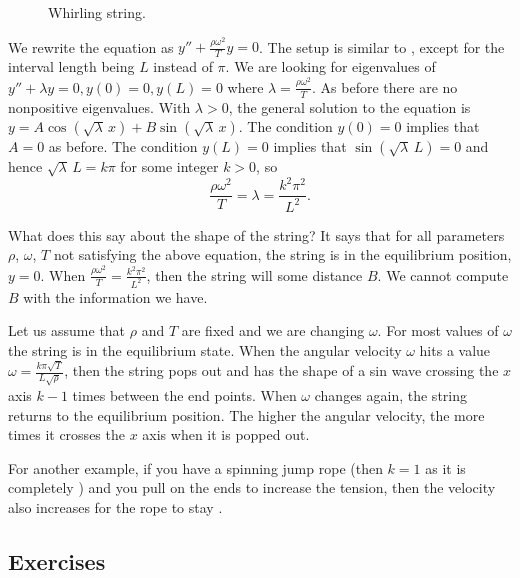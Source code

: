 \documentclass[12pt]{book}
\begin{document}
\begin{figure}[h!t]
\capstart
\begin{center}
\caption{Whirling string.\label{bvp:whirstringfig}}
\end{center}
\end{figure}

We rewrite the equation as
$y'' + \frac{\rho \omega^2}{T} y = 0$.
The setup is similar to , except for the
interval length being $L$ instead of $\pi$.  We are looking for eigenvalues
of $y'' + \lambda y = 0, y(0) = 0, y(L) = 0$ where
$\lambda = \frac{\rho \omega^2}{T}$.  As before
there are no nonpositive eigenvalues.  With $\lambda > 0$,
the general solution to the equation is $y = A \cos ( \! \sqrt{\lambda} \,x ) + B
\sin ( \! \sqrt{\lambda} \,x )$.  The condition $y(0) = 0$ implies that $A = 0$ as
before.  The condition $y(L) = 0$ implies that
$\sin ( \! \sqrt{\lambda} \, L) = 0$ and hence
$\sqrt{\lambda} \, L = k \pi$  for some integer $k > 0$, so
\begin{equation*}
\frac{\rho \omega^2}{T} = \lambda = \frac{k^2 \pi^2}{L^2} .
\end{equation*}

What does this say about the shape of the string?  It says that for
all parameters $\rho$, $\omega$, $T$ not satisfying the above equation, the
string is in the equilibrium position, $y=0$.  When 
$\frac{\rho \omega^2}{T} = \frac{k^2 \pi^2}{L^2}$, then the string will
 some distance $B$.  We cannot compute $B$
with the information we have.

Let us assume that $\rho$ and $T$ are fixed and we are changing $\omega$.
For most values of $\omega$ the string is in the equilibrium state.  When 
the angular velocity $\omega$ hits a value
$\omega = \frac{k \pi \sqrt{T}}{L\sqrt{\rho}}$, then the string 
pops out and has the shape of a sin wave crossing the
$x$ axis $k-1$ times between the end points.  When $\omega$ changes again, the string returns to
the equilibrium position.  The higher the angular velocity,
the more times it crosses the $x$ axis when it is popped out.

For another example, if you have a spinning jump rope (then $k=1$ as it is
completely ) and you
pull on the ends to increase the tension, then the velocity also increases
for the rope to stay .


\subsection{Exercises}
\end{document}
